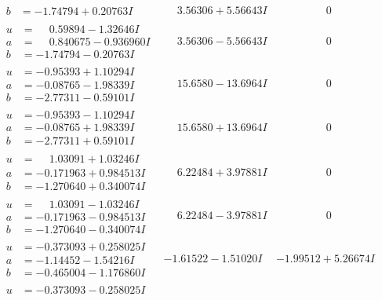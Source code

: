 \documentclass[1p]{elsarticle_modified}
\theoremstyle{definition}
\begin{document}
$$\begin{array}{c|c|c}
\begin{aligned}
b &= -1.74794 + 0.20763 I\end{aligned}
 & \phantom{-}3.56306 + 5.56643 I & \phantom{-0.000000 } 0 \\ \hline\begin{aligned}
u &= \phantom{-}0.59894 - 1.32646 I \\
a &= \phantom{-}0.840675 - 0.936960 I \\
b &= -1.74794 - 0.20763 I\end{aligned}
 & \phantom{-}3.56306 - 5.56643 I & \phantom{-0.000000 } 0 \\ \hline\begin{aligned}
u &= -0.95393 + 1.10294 I \\
a &= -0.08765 - 1.98339 I \\
b &= -2.77311 - 0.59101 I\end{aligned}
 & \phantom{-}15.6580 - 13.6964 I & \phantom{-0.000000 } 0 \\ \hline\begin{aligned}
u &= -0.95393 - 1.10294 I \\
a &= -0.08765 + 1.98339 I \\
b &= -2.77311 + 0.59101 I\end{aligned}
 & \phantom{-}15.6580 + 13.6964 I & \phantom{-0.000000 } 0 \\ \hline\begin{aligned}
u &= \phantom{-}1.03091 + 1.03246 I \\
a &= -0.171963 + 0.984513 I \\
b &= -1.270640 + 0.340074 I\end{aligned}
 & \phantom{-}6.22484 + 3.97881 I & \phantom{-0.000000 } 0 \\ \hline\begin{aligned}
u &= \phantom{-}1.03091 - 1.03246 I \\
a &= -0.171963 - 0.984513 I \\
b &= -1.270640 - 0.340074 I\end{aligned}
 & \phantom{-}6.22484 - 3.97881 I & \phantom{-0.000000 } 0 \\ \hline\begin{aligned}
u &= -0.373093 + 0.258025 I \\
a &= -1.14452 - 1.54216 I \\
b &= -0.465004 - 1.176860 I\end{aligned}
 & -1.61522 - 1.51020 I & -1.99512 + 5.26674 I \\ \hline\begin{aligned}
u &= -0.373093 - 0.258025 I \\

\end{aligned}
\end{array}$$
\end{document}
